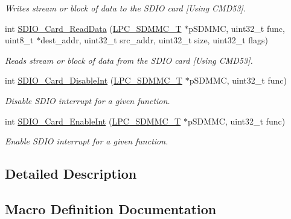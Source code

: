 \begin{DoxyCompactItemize}
\begin{DoxyCompactList}\small\item\em Writes stream or block of data to the S\+D\+IO card \mbox{[}Using C\+M\+D53\mbox{]}. \end{DoxyCompactList}\item 
int \hyperlink{group___s_d_i_o__18_x_x__43_x_x_ga340277ee179263511434895dd79fdd81}{S\+D\+I\+O\+\_\+\+Card\+\_\+\+Read\+Data} (\hyperlink{struct_l_p_c___s_d_m_m_c___t}{L\+P\+C\+\_\+\+S\+D\+M\+M\+C\+\_\+T} $\ast$p\+S\+D\+M\+MC, uint32\+\_\+t func, uint8\+\_\+t $\ast$dest\+\_\+addr, uint32\+\_\+t src\+\_\+addr, uint32\+\_\+t size, uint32\+\_\+t flags)
\begin{DoxyCompactList}\small\item\em Reads stream or block of data from the S\+D\+IO card \mbox{[}Using C\+M\+D53\mbox{]}. \end{DoxyCompactList}\item 
int \hyperlink{group___s_d_i_o__18_x_x__43_x_x_gad4d1162fa4a1e5b2b6c9835d20f28fed}{S\+D\+I\+O\+\_\+\+Card\+\_\+\+Disable\+Int} (\hyperlink{struct_l_p_c___s_d_m_m_c___t}{L\+P\+C\+\_\+\+S\+D\+M\+M\+C\+\_\+T} $\ast$p\+S\+D\+M\+MC, uint32\+\_\+t func)
\begin{DoxyCompactList}\small\item\em Disable S\+D\+IO interrupt for a given function. \end{DoxyCompactList}\item 
int \hyperlink{group___s_d_i_o__18_x_x__43_x_x_ga304515a4a0d3e71651e74bbdde07ba3f}{S\+D\+I\+O\+\_\+\+Card\+\_\+\+Enable\+Int} (\hyperlink{struct_l_p_c___s_d_m_m_c___t}{L\+P\+C\+\_\+\+S\+D\+M\+M\+C\+\_\+T} $\ast$p\+S\+D\+M\+MC, uint32\+\_\+t func)
\begin{DoxyCompactList}\small\item\em Enable S\+D\+IO interrupt for a given function. \end{DoxyCompactList}\end{DoxyCompactItemize}


\subsection{Detailed Description}


\subsection{Macro Definition Documentation}
\mbox{\label{group___s_d_i_o__18_x_x__43_x_x_ga938c1466755f12fb04ac0d1b775584d1}} 
